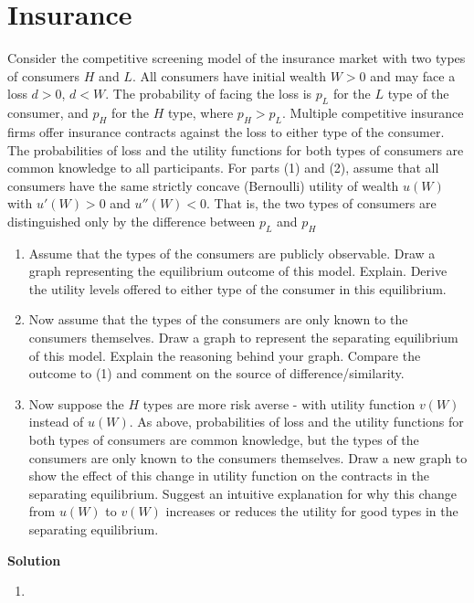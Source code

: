 \documentclass[a4paper]{article}
\begin{document}
\section*{Insurance}
Consider the competitive screening model of the insurance market with two types of
consumers $H$ and $L$. All consumers have initial wealth $W > 0$ and may face a loss $d > 0$,
$d < W$. The probability of facing the loss is $p_L$ for the $L$ type of the consumer, and
$p_H$ for the $H$ type, where $p_H > p_L$. Multiple competitive insurance firms offer insurance
contracts against the loss to either type of the consumer. The probabilities of loss and the
utility functions for both types of consumers are common knowledge to all participants.
For parts (1) and (2), assume that all consumers have the same strictly concave
(Bernoulli) utility of wealth $u(W)$ with $u'(W) > 0$ and $u''(W) < 0$. That is, the two types
of consumers are distinguished only by the difference between $p_L$ and $p_H$
\begin{enumerate}
	\item  Assume that the types of the consumers are publicly observable. Draw a graph
	representing the equilibrium outcome of this model. Explain. Derive the utility levels offered to either type of the consumer in this equilibrium.
	\item Now assume that the types of the consumers are only known to the consumers themselves. Draw a graph to represent the separating equilibrium of this model. Explain the reasoning behind your graph. Compare the outcome to (1) and comment on
	the source of difference/similarity.
	\item Now suppose the $H$ types are more risk averse - with utility function $v(W)$ instead
	of $u(W)$. As above, probabilities of loss and the utility functions for both types of
	consumers are common knowledge, but the types of the consumers are only known
	to the consumers themselves. Draw a new graph to show the effect of this change in
	utility function on the contracts in the separating equilibrium. Suggest an intuitive
	explanation for why this change from $u(W)$ to $v(W)$ increases or reduces the utility
	for good types in the separating equilibrium.
\end{enumerate}


\textbf{Solution}

\begin{enumerate}
	\item 
\end{enumerate}
\end{document}
